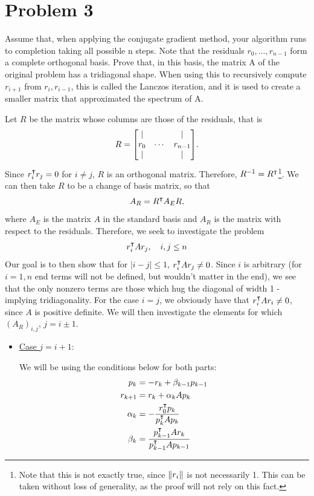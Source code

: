 \section{Problem 3}
Assume that, when applying the conjugate gradient method, your algorithm runs to completion taking all possible n steps. Note that the residuals $r_0, ..., r_{n-1}$ form a complete orthogonal basis. Prove that, in this basis, the matrix A of the original problem has a tridiagonal shape. When using this to recursively compute $r_{i+1}$ from $r_i, r_{i-1}$, this is called the Lanczos iteration, and it is used to create a smaller matrix that approximated the spectrum of A.
\partbreak
\begin{solution}

    Let $R$ be the matrix whose columns are those of the residuals, that is 
    \[R = \mqty[|&&|\\r_0&\cdots&r_{n-1}\\|&&|].\]
    Since $r_i^\intercal r_j = 0$ for $i \neq j$, $R$ is an orthogonal matrix. Therefore, $R^{-1} = R^\intercal$\footnote{Note that this is not exactly true, since $\norm{r_i}$ is not necessarily 1. This can be taken without loss of generality, as the proof will not rely on this fact.}. We can then take $R$ to be a change of basis matrix, so that 
    \[A_R = R^\intercal A_E R,\]
    where $A_E$ is the matrix $A$ in the standard basis and $A_R$ is the matrix with respect to the residuals. Therefore, we seek to investigate the problem
    \[r_i^\intercal Ar_j, \quad i, j \leq n\]
    Our goal is to then show that for $|i - j| \leq 1$, $r_i^\intercal A r_j \neq 0$. Since $i$ is arbitrary (for $i = 1, n$ end terms will not be defined, but wouldn't matter in the end), we see that the only nonzero terms are those which hug the diagonal of width 1 - implying tridiagonality. For the case $i = j$, we obviously have that $r_i^\intercal Ar_i \neq 0$, since $A$ is positive definite. We will then investigate the elements for which $(A_R)_{i, j}$, $j = i \pm 1$.
    \begin{itemize}
        \item \underline{Case $j = i+1$}:

        \hop
        We will be using the conditions below for both parts:
        \begin{align}
            p_k &= -r_k + \beta_{k-1}p_{k-1}\\
            r_{k+1} &= r_k + \alpha_k Ap_k\\
            \alpha_k &= -\frac{r_0^\intercal p_k}{p_k^\intercal Ap_k}\\
            \beta_k &= \frac{p_{k-1}^\intercal Ar_k}{p_{k-1}^\intercal Ap_{k-1}}
        \end{align}


\end{itemize}
\end{solution}
